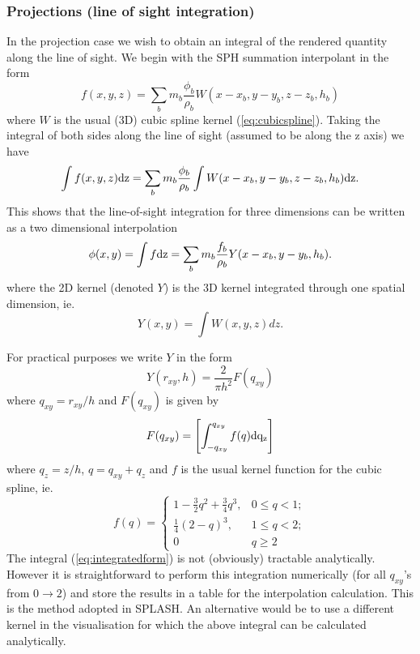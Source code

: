 \documentclass[a4paper,11pt]{article}
\begin{document}
\subsubsection{Projections (line of sight integration)}
\label{sec:proj}
 In the projection case we wish to obtain an integral of the rendered quantity along the line of sight. We
begin with the SPH summation interpolant \citep{monaghan92} in the form
\begin{equation}
f(x,y,z) = \sum_b m_b \frac{\phi_b}{\rho_b} W(x - x_b, y-y_b, z-z_b, h_b)
\end{equation}
where $W$ is the usual (3D) cubic spline kernel (\ref{eq:cubicspline}). Taking the integral of both sides
along the line of sight (assumed to be along the z axis) we have
\begin{equation}
\int f(x,y,z) {\rm dz} = \sum_b m_b \frac{\phi_b}{\rho_b} \int W(x - x_b, y-y_b, z-z_b, h_b) {\rm dz}.
\end{equation}
This shows that the line-of-sight integration for three dimensions can be written as a two dimensional
interpolation
\begin{equation}
\phi(x,y) = \int f {\rm dz} = \sum_b m_b \frac{f_b}{\rho_b} Y(x - x_b, y-y_b, h_b).
\end{equation}
where the 2D kernel (denoted $Y$) is the 3D kernel integrated through one spatial
dimension, ie.
\begin{equation}
Y(x,y) = \int W(x,y,z) dz.
\end{equation}


For practical purposes we write $Y$ in the form
\begin{equation}
Y(r_{xy}, h) = \frac{2}{\pi h^2} F(q_{xy})
\end{equation}
where $q_{xy} = r_{xy}/h$ and $F(q_{xy})$ is given by
\begin{equation}
F(q_{xy}) = \left[ \int_{-q_{xy}}^{q_{xy}} f(q){\rm dq_z} \right] \label{eq:integratedform}
\end{equation}
where $q_z=z/h$, $q= q_{xy} + q_z$ and $f$ is the usual kernel function for the cubic spline, ie.
\begin{equation}
f(q) = \left\{ \begin{array}{ll}
1 - \frac{3}{2}q^2 + \frac{3}{4}q^3, & 0 \le q < 1; \\
\frac{1}{4}(2-q)^3, & 1 \le q < 2; \\
0 & q \ge 2 \end{array} \right.
\end{equation}
The integral (\ref{eq:integratedform}) is not (obviously) tractable analytically. However it is
straightforward to perform this integration numerically (for all $q_{xy}$'s from $0\to 2$) and store the results in a table for the
interpolation calculation. This is the method adopted in SPLASH. An alternative would be to use a
different kernel in the visualisation for which the above integral can be calculated analytically.
\end{document}
